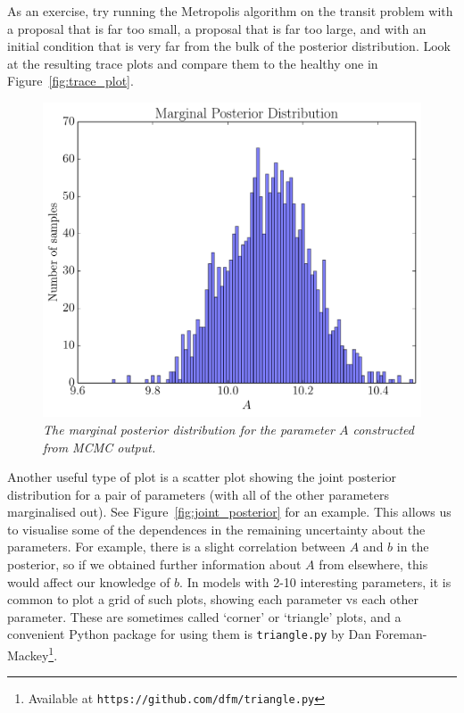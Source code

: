 As an exercise, try running the Metropolis algorithm on the transit problem
with a proposal that is far too small, a proposal that is far too large, and
with an initial condition that is very far from the bulk of the posterior
distribution. Look at the resulting trace plots and
compare them to the healthy one in Figure~\ref{fig:trace_plot}.

\begin{figure}
\begin{center}
\includegraphics[scale=0.45]{marginal_posterior.pdf}
\caption{\it The marginal posterior distribution for the parameter $A$ constructed
from MCMC output.\label{fig:marginal_posterior}}
\end{center}
\end{figure}

Another useful type of plot is a scatter plot showing the joint posterior
distribution for a pair of parameters (with all of the other parameters
marginalised out). See Figure~\ref{fig:joint_posterior} for an example.
This allows us to visualise some of the dependences in the remaining
uncertainty about the parameters. For example, there is a slight correlation
between $A$ and $b$ in the posterior, so if we obtained further information
about $A$ from elsewhere, this would affect our knowledge of $b$.
In models with 2-10 interesting parameters, it is common to plot a grid
of such plots, showing each parameter vs each other parameter. These are
sometimes called `corner' or `triangle' plots, and a convenient Python package
for using them is {\tt triangle.py} by Dan
Foreman-Mackey\footnote{Available at
{\tt https://github.com/dfm/triangle.py}}.

